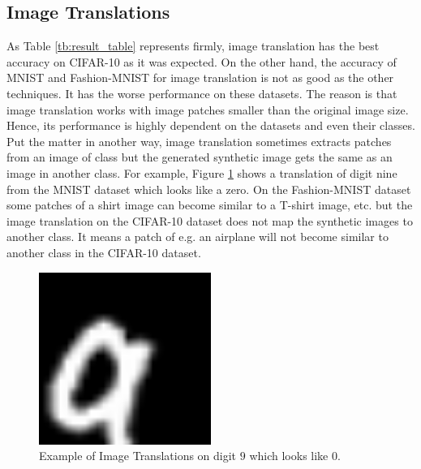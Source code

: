 \subsection{Image Translations}
As Table \ref{tb:result_table} represents firmly, image translation has the best accuracy on CIFAR-10 as it
was expected. On the other hand, the accuracy of MNIST and Fashion-MNIST for image translation is not
as good as the other techniques. It has the worse performance on these datasets. The reason is
that image translation works with image patches smaller than the original image size. Hence, its
performance is highly dependent on the datasets and even their classes. Put the matter in another
way, image translation sometimes extracts patches from an image of class but the generated synthetic
image gets the same as an image in another class. For example, Figure \ref{fig:image_translation_example_bad_accuracy} shows a translation of
digit nine from the MNIST dataset which looks like a zero. On the Fashion-MNIST dataset some patches
of a shirt image can become similar to a T-shirt image, etc. but the image translation on the CIFAR-10
dataset does not map the synthetic images to another class. It means a patch of e.g. an airplane will
not become similar to another class in the CIFAR-10 dataset.
\begin{figure}
  \centering
  \label{fig:image_translation_example_bad_accuracy}
  \includegraphics[width=0.5\textwidth]{fig/result/Image_translations_mnist}
  \caption{Example of Image Translations on digit $9$ which looks like $0$.}
\end{figure}

